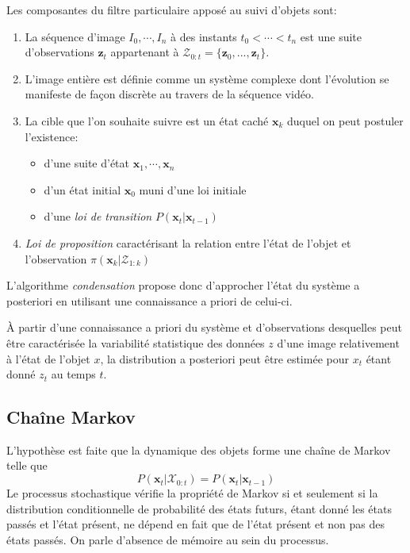 \documentclass[a4paper,12pt]{report}
\begin{document}
Les composantes du filtre particulaire apposé au suivi d'objets sont:
\begin{enumerate}
\item La séquence d'image $I_0,\cdots,I_n$ à des instants $t_0<\cdots<t_n$ est une suite d'observations $\mathbf{z}_t$ appartenant à $ \mathcal{Z}_{0:t}=\{\mathbf{z}_0,...,\mathbf{z}_t\}$.
\item[] L'image entière est définie comme un système complexe dont l'évolution se manifeste de façon discrète au travers de la séquence vidéo.
\item La cible que l'on souhaite suivre est un état caché $\mathbf{x}_k$ duquel on peut postuler l'existence:
	\begin{itemize}
	\item d'une suite d'état $\mathbf{x}_1,\cdots,\mathbf{x}_n$
	\item d'un état initial $\mathbf{x}_0$ muni d'une loi initiale
	\item d'une \textit{loi de transition} $P(\mathbf{x}_t|\mathbf{x}_{t-1})$
\end{itemize}
\item \textit{Loi de proposition} caractérisant la relation entre l'état de l'objet et l'observation $\pi(\mathbf{x}_k|\mathcal{Z}_{1:k})$\\
\end{enumerate}

L'algorithme \textit{condensation} propose donc d'approcher l'état du système a posteriori en utilisant une connaissance a priori de celui-ci.
 
À partir d'une connaissance a priori du système et d'observations desquelles peut être caractérisée la variabilité statistique des données $z$ d'une image relativement à l'état de l'objet $x$, la distribution a posteriori peut être estimée pour $x_t$ étant donné $z_t$ au temps $t$.\\

\subsection{Chaîne Markov}
L'hypothèse est faite que la dynamique des objets forme une chaîne de Markov telle que $$P(\mathbf{x}_{t}|\mathcal{X}_{0:t})=P(\mathbf{x}_t|\mathbf{x}_{t-1})$$
Le processus stochastique vérifie la propriété de Markov si et seulement si la distribution conditionnelle de probabilité des états futurs, étant donné les états passés et l'état présent, ne dépend en fait que de l'état présent et non pas des états passés. On parle d'absence de mémoire au sein du processus.
\end{document}
